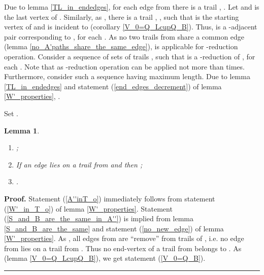 \documentclass[a4paper, 12pt]{article}
\newtheorem{lemma}{Lemma}[subsection]
\newenvironment{proof}[1][Proof]{\noindent\textbf{#1.} }{\ \rule{0.5em}{0.5em}}
\begin{document}
Due to lemma \ref{TL_in_endedges}, for each edge from  there is
a trail , . Let  and  is the last vertex of . Similarly, as , there is a trail ,
, such that  is the starting vertex of  and is
incident to  (corollary \ref{V_0=Q_LcupQ_B}). Thus,
 is a -adjacent pair corresponding to , for each
. As no two trails from  share a common edge (lemma
\ref{no_A'paths_share_the_same_edge}),  is applicable for
-reduction operation. Consider a sequence of sets of trails
, such that  is a -reduction of
, for each . Note that  as
-reduction operation can be applied not more than 
times. Furthermore, consider such a sequence 
having maximum length. Due to lemma \ref{TL_in_endedges} and
statement (\ref{end_edges_decrement}) of lemma \ref{W'_properties},
.

Set .
\begin{lemma}\label{A''_properties}\
\renewcommand{\labelenumi}{(\arabic{enumi})}
\begin{enumerate}
\item \label{A''inT_o} ;
\item \label{S_and_B_are_the_same_in_A''} If an edge  lies on a
trail from   and  then ;
\item \label{V_0=Q_B} .
\end{enumerate}
\end{lemma}
\begin{proof}
Statement (\ref{A''inT_o}) immediately follows from statement
(\ref{W'_in_T_o}) of lemma \ref{W'_properties}. Statement
(\ref{S_and_B_are_the_same_in_A''}) is implied from lemma
\ref{S_and_B_are_the_same} and statement (\ref{no_new_edge}) of
lemma \ref{W'_properties}. As , all edges from  are
``remove'' from trails of , i.e. no edge from  lies on a
trail from . Thus no end-vertex of a trail from  belongs
to . As  (lemma \ref{V_0=Q_LcupQ_B}),
we get statement (\ref{V_0=Q_B}).
\end{proof}
\end{document}
